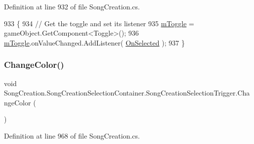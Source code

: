 Definition at line 932 of file Song\+Creation.\+cs.


\begin{DoxyCode}
933             \{
934                 \textcolor{comment}{// Get the toggle and set its listener}
935                 \hyperlink{class_song_creation_1_1_song_creation_selection_container_1_1_song_creation_selection_trigger_affc6248c907c4357b0a0a30b86635f3a}{mToggle} = gameObject.GetComponent<Toggle>();
936                 \hyperlink{class_song_creation_1_1_song_creation_selection_container_1_1_song_creation_selection_trigger_affc6248c907c4357b0a0a30b86635f3a}{mToggle}.onValueChanged.AddListener( \hyperlink{class_song_creation_1_1_song_creation_selection_container_1_1_song_creation_selection_trigger_a33e6eb8e123cb32f40c2c06149a31087}{OnSelected} );
937             \}
\end{DoxyCode}
\mbox{\label{class_song_creation_1_1_song_creation_selection_container_1_1_song_creation_selection_trigger_a3e790d06e364f26ed6f8a78cb87bbf6d}} 
\subsubsection{\texorpdfstring{Change\+Color()}{ChangeColor()}}
{\footnotesize\ttfamily void Song\+Creation.\+Song\+Creation\+Selection\+Container.\+Song\+Creation\+Selection\+Trigger.\+Change\+Color (\begin{DoxyParamCaption}{ }\end{DoxyParamCaption})\hspace{0.3cm}{\ttfamily [private]}}



Definition at line 968 of file Song\+Creation.\+cs.


